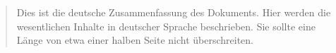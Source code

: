 


\begin{abstract}
    Dies ist die deutsche Zusammenfassung des Dokuments. Hier werden die wesentlichen Inhalte in deutscher Sprache beschrieben. Sie sollte eine Länge von etwa einer halben Seite nicht überschreiten.
\end{abstract}

